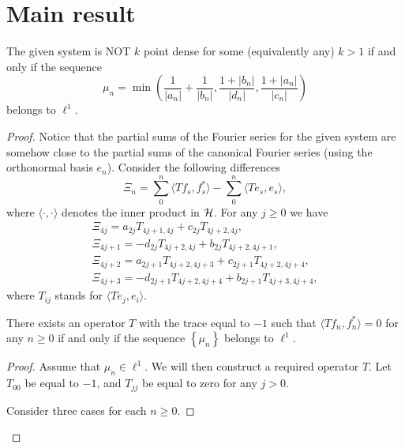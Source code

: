   \section{Main result}
    \begin{theorem}
      The given system is NOT $k$ point dense for some (equivalently any) $k > 1$ if and only if the sequence
      \[
        \mu_n = \min\left(\frac{1}{|a_n|} + \frac{1}{|b_n|}, \frac{1 + |b_n|}{|d_n|}, \frac{1 + |a_n|}{|c_n|}\right)
      \]
        belongs to $\ell^1$.
    \end{theorem}
    \begin{proof}
      Notice that the partial sums of the Fourier series for the given system are somehow close to the
        partial sums of the canonical Fourier series (using the orthonormal basis $e_n$).
      Consider the following differences
      \[
        \Xi_n = \sum_0^n \langle Tf_s, f_s^* \rangle - \sum_0^n \langle Te_s, e_s \rangle,
      \]
        where $\langle \cdot, \cdot\rangle$ denotes the inner product in $\cal{H}$.
      For any $j \geq 0$ we have
      \begin{align*}
        \Xi_{4j} = a_{2j} T_{4j+1, 4j} + c_{2j} T_{4j+2, 4j},\\
        \Xi_{4j + 1} = -d_{2j} T_{4j+2, 4j} + b_{2j} T_{4j+2, 4j+1},\\
        \Xi_{4j + 2} = a_{2j+1} T_{4j+2, 4j+3} + c_{2j+1} T_{4j+2, 4j+4},\\
        \Xi_{4j + 3} = -d_{2j+1} T_{4j+2, 4j+4} + b_{2j+1} T_{4j+3, 4j+4},
      \end{align*}
      where $T_{ij}$ stands for $\langle Te_j, e_i \rangle$.
      \begin{prop}
        \label{inf-dim-statement}
        There exists an operator $T$ with the trace equal to $-1$ such that $\langle Tf_n, f_n^*\rangle = 0$ for any $n \geq 0$
          if and only if the sequence $\left\{\mu_n\right\}$ belongs to $\ell^1$.
      \end{prop}
      \begin{proof}
        Assume that $\mu_n \in \ell^1$.
        We will then construct a required operator $T$.
        Let $T_{00}$ be equal to $-1$, and $T_{jj}$ be equal to zero for any $j > 0$.

        Consider three cases for each $n \geq 0$.


\end{proof}
\end{proof}
